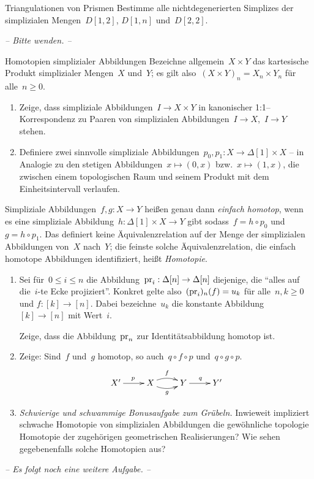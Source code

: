 \documentclass{uebblatt}
\begin{document}
\begin{aufgabe}{Triangulationen von Prismen}
Bestimme alle nichtdegenerierten Simplizes der simplizialen Mengen~$D[1,2]$,
$D[1,n]$ und~$D[2,2]$.
\end{aufgabe}

\begin{center}\emph{-- Bitte wenden. --}\end{center}

\newpage

\begin{aufgabe}{Homotopien simplizialer Abbildungen}
Bezeichne allgemein~$X \times Y$ das kartesische Produkt simplizialer
Mengen~$X$ und~$Y$; es gilt also~$(X \times Y)_n = X_n \times Y_n$ für alle~$n
\geq 0$.

\begin{enumerate}
\item Zeige, dass simpliziale Abbildungen~$I \to X \times Y$ in kanonischer
1:1--Korrespondenz zu Paaren von simplizialen Abbildungen~$I \to X$,~$I \to Y$
stehen.
\item Definiere zwei sinnvolle simpliziale Abbildungen~$p_0, p_1 : X \to
\Delta[1] \times X$ -- in Analogie zu den stetigen Abbildungen~$x \mapsto
(0,x)$ bzw.~$x \mapsto (1,x)$, die zwischen einem topologischen Raum und seinem
Produkt mit dem Einheitsintervall verlaufen.
\end{enumerate}
Simpliziale Abbildungen~$f,g : X \to Y$ heißen genau dann \emph{einfach
homotop}, wenn es eine simpliziale Abbildung~$h : \Delta[1] \times X \to Y$
gibt sodass~$f = h \circ p_0$ und~$g = h \circ p_1$. Das definiert keine
Äquivalenzrelation auf der Menge der simplizialen Abbildungen von~$X$ nach~$Y$;
die feinste solche Äquivalenzrelation, die einfach homotope Abbildungen
identifiziert, heißt \emph{Homotopie}.
\begin{enumerate}
\addtocounter{enumi}{2}
\item Sei für~$0 \leq i \leq n$ die Abbildung~$\mathrm{pr}_i : \Delta[n] \to \Delta[n]$
diejenige, die ``alles auf die~$i$-te Ecke projiziert''. Konkret gelte
also~$(\mathrm{pr}_i)_n(f) = u_k$ für alle~$n,k \geq 0$ und $f : [k] \to [n]$. Dabei
bezeichne~$u_k$ die konstante Abbildung~$[k] \to [n]$ mit Wert~$i$.

Zeige, dass die Abbildung~$\mathrm{pr}_n$ zur Identitätsabbildung homotop ist.

\item Zeige: Sind~$f$ und~$g$ homotop, so
auch~$q \circ f \circ p$ und~$q \circ g \circ p$.
\[ \xymatrix{
  X' \ar[r]^p & X \ar@/^/[r]^f \ar@/_/[r]_g & Y \ar[r]^q & Y'
} \]

\item \emph{Schwierige und schwammige Bonusaufgabe zum Grübeln.} Inwieweit
impliziert schwache Homotopie von simplizialen Abbildungen die gewöhnliche
topologie Homotopie der zugehörigen geometrischen Realisierungen? Wie sehen
gegebenenfalls solche Homotopien aus?
\end{enumerate}
\end{aufgabe}

\begin{center}\emph{-- Es folgt noch eine weitere Aufgabe. --}\end{center}
\end{document}
